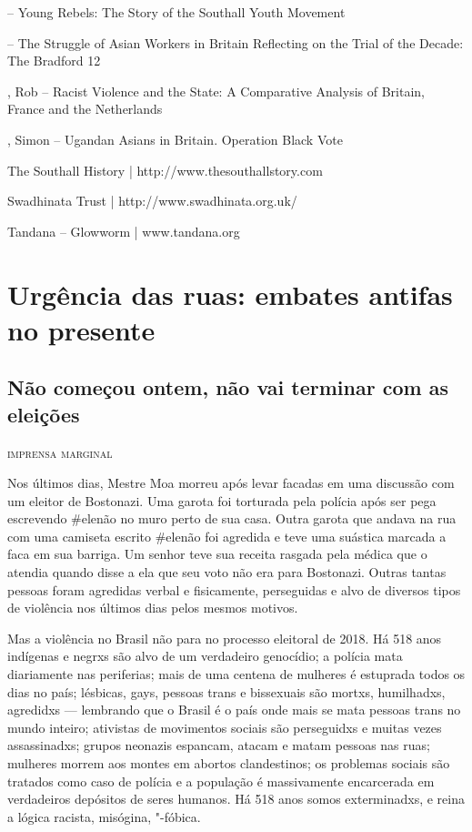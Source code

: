 \begin{Parskip}
 -- Young Rebels: The Story of the Southall Youth Movement

 -- The Struggle of Asian Workers in Britain Reflecting on the Trial of the Decade: The Bradford 12

, Rob -- Racist Violence and the State: A Comparative Analysis of Britain, France and the Netherlands

, Simon -- Ugandan Asians in Britain. Operation Black Vote

The Southall History | http://www.thesouthallstory.com

Swadhinata Trust | http://www.swadhinata.org.uk/

Tandana -- Glowworm | www.tandana.org
\end{Parskip}


\part{Urgência das ruas: embates antifas no presente}

\chapter{Não começou ontem, não vai terminar com as eleições}

\hfill{}\textsc{imprensa marginal}

\bigskip

Nos últimos dias, Mestre Moa morreu após levar  facadas em uma discussão com um eleitor de Bostonazi. Uma garota foi torturada pela polícia após ser pega escrevendo \#elenão no muro perto de sua casa. Outra garota que andava na rua com uma camiseta escrito \#elenão foi agredida e teve uma suástica marcada a faca em sua barriga. Um senhor teve sua receita rasgada pela médica que o atendia quando disse a ela que seu voto não era para Bostonazi. Outras tantas pessoas foram agredidas verbal e fisicamente, perseguidas e alvo de diversos tipos de violência nos últimos dias pelos mesmos motivos.

Mas a violência no Brasil não para no processo eleitoral de 2018. Há 518 anos indígenas e negrxs são alvo de um verdadeiro genocídio; a polícia mata diariamente nas periferias; mais de uma centena de mulheres é estuprada todos os dias no país; lésbicas, gays, pessoas trans e bissexuais são mortxs, humilhadxs, agredidxs --- lembrando que o Brasil é o país onde mais se mata pessoas trans no mundo inteiro; ativistas de movimentos sociais são perseguidxs e muitas vezes assassinadxs; grupos neonazis espancam, atacam e matam pessoas nas ruas; mulheres morrem aos montes em abortos clandestinos; os problemas sociais são tratados como caso de polícia e a população é massivamente encarcerada em verdadeiros depósitos de seres humanos. Há 518 anos somos exterminadxs, e reina a lógica racista, misógina, "-fóbica.

